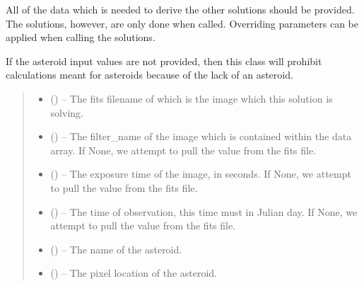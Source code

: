 \documentclass[letterpaper,11pt,english]{sphinxmanual}
\begin{document}
\begin{savenotes}
\begin{fulllineitems}
\begin{savenotes}
\begin{fulllineitems}
\sphinxAtStartPar
All of the data which is needed to derive the other solutions should
be provided. The solutions, however, are only done when called.
Overriding parameters can be applied when calling the solutions.

\sphinxAtStartPar
If the asteroid input values are not provided, then this class will
prohibit calculations meant for asteroids because of the lack
of an asteroid.
\begin{quote}\begin{description}
\begin{itemize}
\item {} 
\sphinxAtStartPar
{} () – The fits filename of which is the image which this solution is
solving.

\item {} 
\sphinxAtStartPar
{} (\sphinxstyleliteralemphasis{\sphinxupquote{, }}) – The filter\_name of the image which is contained within the data
array. If None, we attempt to pull the value from the fits file.

\item {} 
\sphinxAtStartPar
{} (\sphinxstyleliteralemphasis{\sphinxupquote{, }}) – The exposure time of the image, in seconds.
If None, we attempt to pull the value from the fits file.

\item {} 
\sphinxAtStartPar
{} (\sphinxstyleliteralemphasis{\sphinxupquote{, }}) – The time of observation, this time must in Julian day.
If None, we attempt to pull the value from the fits file.

\item {} 
\sphinxAtStartPar
{} (\sphinxstyleliteralemphasis{\sphinxupquote{, }}) – The name of the asteroid.

\item {} 
\sphinxAtStartPar
{} (\sphinxstyleliteralemphasis{\sphinxupquote{, }}) – The pixel location of the asteroid.


\end{itemize}
\end{description}
\end{quote}
\end{fulllineitems}
\end{savenotes}
\end{fulllineitems}
\end{savenotes}
\end{document}

